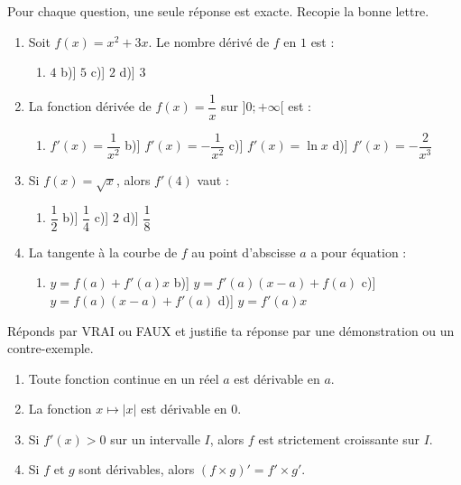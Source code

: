 \documentclass[11pt]{article}
\begin{document}
\begin{exercice}
Pour chaque question, une seule réponse est exacte. Recopie la bonne lettre.
\begin{enumerate}
\item Soit $f(x)=x^2+3x$. Le nombre dérivé de $f$ en $1$ est :
\begin{enumerate}
\item[a)] $4$ \quad b)] $5$ \quad c)] $2$ \quad d)] $3$
\end{enumerate}
\item La fonction dérivée de $f(x)=\dfrac{1}{x}$ sur $]0;+\infty[$ est :
\begin{enumerate}
\item[a)] $f'(x)=\dfrac{1}{x^2}$ \quad b)] $f'(x)=-\dfrac{1}{x^2}$ \quad c)] $f'(x)=\ln x$ \quad d)] $f'(x)=-\dfrac{2}{x^3}$
\end{enumerate}
\item Si $f(x)=\sqrt{x}$, alors $f'(4)$ vaut :
\begin{enumerate}
\item[a)] $\dfrac{1}{2}$ \quad b)] $\dfrac{1}{4}$ \quad c)] $2$ \quad d)] $\dfrac{1}{8}$
\end{enumerate}
\item La tangente à la courbe de $f$ au point d'abscisse $a$ a pour équation :
\begin{enumerate}
\item[a)] $y=f(a)+f'(a)x$ \quad b)] $y=f'(a)(x-a)+f(a)$ \quad c)] $y=f(a)(x-a)+f'(a)$ \quad d)] $y=f'(a)x$
\end{enumerate}
\end{enumerate}
\end{exercice}

\begin{exercice}
Réponds par VRAI ou FAUX et justifie ta réponse par une démonstration ou un contre-exemple.
\begin{enumerate}
\item Toute fonction continue en un réel $a$ est dérivable en $a$.
\item La fonction $x\mapsto |x|$ est dérivable en $0$.
\item Si $f'(x)>0$ sur un intervalle $I$, alors $f$ est strictement croissante sur $I$.
\item Si $f$ et $g$ sont dérivables, alors $(f\times g)'=f'\times g'$.
\end{enumerate}
\end{exercice}
\end{document}
